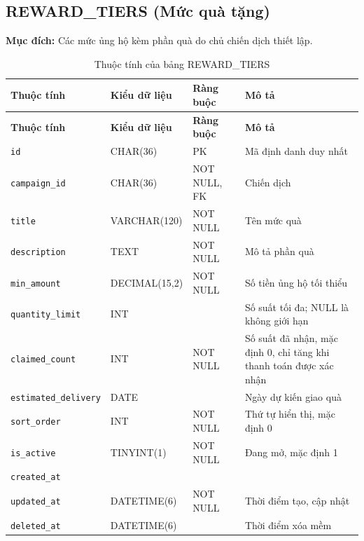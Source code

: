 \subsection{REWARD\_\allowbreak{}TIERS (Mức quà tặng)}

\textbf{Mục đích:} Các mức ủng hộ kèm phần quà do chủ chiến dịch thiết lập.

{\small
\begin{longtable}{|P{3.2cm}|P{2.8cm}|P{2.2cm}|p{5.4cm}|}
    \caption{Thuộc tính của bảng REWARD\_\allowbreak{}TIERS}
    \label{tab:reward_tiers} \\
    \hline
    \textbf{Thuộc tính} & \textbf{Kiểu dữ liệu} & \textbf{Ràng buộc} & \textbf{Mô tả} \\
    \hline
    \endfirsthead
    \hline
    \textbf{Thuộc tính} & \textbf{Kiểu dữ liệu} & \textbf{Ràng buộc} & \textbf{Mô tả} \\
    \hline
    \endhead

    \texttt{id} & CHAR(36) & PK & Mã định danh duy nhất \\
    \hline
    \texttt{campaign\_\allowbreak{}id} & CHAR(36) & NOT NULL, FK & Chiến dịch \\
    \hline
    \texttt{title} & VARCHAR(120) & NOT NULL & Tên mức quà \\
    \hline
    \texttt{description} & TEXT & NOT NULL & Mô tả phần quà \\
    \hline
    \texttt{min\_\allowbreak{}amount} & DECIMAL(15,2) & NOT NULL & Số tiền ủng hộ tối thiểu \\
    \hline
    \texttt{quantity\_\allowbreak{}limit} & INT &  & Số suất tối đa; NULL là không giới hạn \\
    \hline
    \texttt{claimed\_\allowbreak{}count} & INT & NOT NULL & Số suất đã nhận, mặc định 0, chỉ tăng khi thanh toán được xác nhận \\
    \hline
    \texttt{estimated\_\allowbreak{}delivery} & DATE &  & Ngày dự kiến giao quà \\
    \hline
    \texttt{sort\_\allowbreak{}order} & INT & NOT NULL & Thứ tự hiển thị, mặc định 0 \\
    \hline
    \texttt{is\_\allowbreak{}active} & TINYINT(1) & NOT NULL & Đang mở, mặc định 1 \\
    \hline
    \texttt{created\_\allowbreak{}at} &  &  &  \\
    \hline
    \texttt{updated\_\allowbreak{}at} & DATETIME(6) & NOT NULL & Thời điểm tạo, cập nhật \\
    \hline
    \texttt{deleted\_\allowbreak{}at} & DATETIME(6) &  & Thời điểm xóa mềm \\
    \hline
\end{longtable}
}

